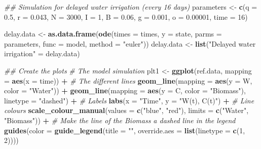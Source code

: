 \documentclass[
]{article}
\newenvironment{Shaded}{\begin{snugshade}}{\end{snugshade}}
\newcommand{\CommentTok}[1]{\textcolor[rgb]{0.56,0.35,0.01}{\textit{#1}}}
\newcommand{\DataTypeTok}[1]{\textcolor[rgb]{0.13,0.29,0.53}{#1}}
\newcommand{\DecValTok}[1]{\textcolor[rgb]{0.00,0.00,0.81}{#1}}
\newcommand{\FloatTok}[1]{\textcolor[rgb]{0.00,0.00,0.81}{#1}}
\newcommand{\KeywordTok}[1]{\textcolor[rgb]{0.13,0.29,0.53}{\textbf{#1}}}
\newcommand{\NormalTok}[1]{#1}
\newcommand{\OperatorTok}[1]{\textcolor[rgb]{0.81,0.36,0.00}{\textbf{#1}}}
\newcommand{\StringTok}[1]{\textcolor[rgb]{0.31,0.60,0.02}{#1}}
\begin{document}
\begin{Shaded}
\begin{Highlighting}[numbers=left,,]
\CommentTok{\#\# Simulation for delayed water irrigation (every 16 days)}
\NormalTok{parameters \textless{}{-}}\StringTok{ }\KeywordTok{c}\NormalTok{(}\DataTypeTok{q =} \FloatTok{0.5}\NormalTok{, }\DataTypeTok{r =} \FloatTok{0.043}\NormalTok{, }\DataTypeTok{N =} \DecValTok{3000}\NormalTok{, }\DataTypeTok{I =} \DecValTok{1}\NormalTok{,}
                \DataTypeTok{B =} \FloatTok{0.06}\NormalTok{, }\DataTypeTok{g =} \FloatTok{0.001}\NormalTok{, }\DataTypeTok{o =} \FloatTok{0.00001}\NormalTok{, }\DataTypeTok{time =} \DecValTok{16}\NormalTok{)}

\NormalTok{delay.data \textless{}{-}}\StringTok{ }\KeywordTok{as.data.frame}\NormalTok{(}\KeywordTok{ode}\NormalTok{(}\DataTypeTok{times =}\NormalTok{ times, }\DataTypeTok{y =}\NormalTok{ state, }\DataTypeTok{parms =}\NormalTok{ parameters,}
                                \DataTypeTok{func =}\NormalTok{ model, }\DataTypeTok{method =} \StringTok{"euler"}\NormalTok{))}
\NormalTok{delay.data \textless{}{-}}\StringTok{ }\KeywordTok{list}\NormalTok{(}\StringTok{"Delayed water irrigation"}\NormalTok{ =}\StringTok{ }\NormalTok{delay.data)}


\CommentTok{\#\# Create the plots}
\CommentTok{\# The model simulation}
\NormalTok{plt1 \textless{}{-}}\StringTok{ }\KeywordTok{ggplot}\NormalTok{(ref.data, }\DataTypeTok{mapping =} \KeywordTok{aes}\NormalTok{(}\DataTypeTok{x =}\NormalTok{ time)) }\OperatorTok{+}
\StringTok{          }\CommentTok{\# The different lines}
\StringTok{          }\KeywordTok{geom\_line}\NormalTok{(}\DataTypeTok{mapping =} \KeywordTok{aes}\NormalTok{(}\DataTypeTok{y =}\NormalTok{ W, }\DataTypeTok{color =} \StringTok{"Water"}\NormalTok{)) }\OperatorTok{+}
\StringTok{          }\KeywordTok{geom\_line}\NormalTok{(}\DataTypeTok{mapping =} \KeywordTok{aes}\NormalTok{(}\DataTypeTok{y =}\NormalTok{ C, }\DataTypeTok{color =} \StringTok{"Biomass"}\NormalTok{), }\DataTypeTok{linetype =} \StringTok{"dashed"}\NormalTok{) }\OperatorTok{+}
\StringTok{          }\CommentTok{\# Labels}
\StringTok{          }\KeywordTok{labs}\NormalTok{(}\DataTypeTok{x =} \StringTok{"Time"}\NormalTok{, }\DataTypeTok{y =} \StringTok{"W(t), C(t)"}\NormalTok{) }\OperatorTok{+}
\StringTok{          }\CommentTok{\# Line colours}
\StringTok{          }\KeywordTok{scale\_colour\_manual}\NormalTok{(}\DataTypeTok{values =} \KeywordTok{c}\NormalTok{(}\StringTok{"blue"}\NormalTok{, }\StringTok{"red"}\NormalTok{),}
                              \DataTypeTok{limits =} \KeywordTok{c}\NormalTok{(}\StringTok{"Water"}\NormalTok{, }\StringTok{"Biomass"}\NormalTok{)) }\OperatorTok{+}
\StringTok{          }\CommentTok{\# Make the line of the Biomass a dashed line in the legend}
\StringTok{          }\KeywordTok{guides}\NormalTok{(}\DataTypeTok{color =} \KeywordTok{guide\_legend}\NormalTok{(}\DataTypeTok{title =} \StringTok{""}\NormalTok{,}
                                      \DataTypeTok{override.aes =} \KeywordTok{list}\NormalTok{(}\DataTypeTok{linetype =} \KeywordTok{c}\NormalTok{(}\DecValTok{1}\NormalTok{, }\DecValTok{2}\NormalTok{))))}


\end{Highlighting}
\end{Shaded}
\end{document}
